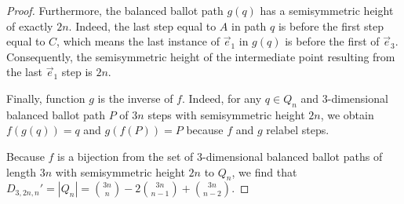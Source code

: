 \documentclass[10pt,a4paper]{amsart}
\begin{document}
\begin{proof}
    Furthermore, the balanced ballot path $g(q)$ has a semisymmetric height of exactly $2n$. Indeed, the last step equal to $A$ in path $q$ is before the first step equal to $C$, which means the last instance of $\vec{e}_1$ in $g(q)$ is before the first of $\vec{e}_3$. Consequently, the semisymmetric height of the intermediate point resulting from the last $\vec{e}_1$ step is $2n$.

    Finally, function $g$ is the inverse of $f$. Indeed, for any $q \in Q_n$ and  3-dimensional balanced ballot path $P$ of $3n$ steps with semisymmetric height $2n$, we obtain $f(g(q)) = q$ and $g(f(P))= P$ because $f$ and $g$ relabel steps.

    Because $f$ is a bijection from the set of $3$-dimensional balanced ballot paths of length $3n$ with semisymmetric height $2n$ to $Q_n$, we find that $D_{3, 2n, n}' = |Q_n| = \binom{3n}{n} - 2\binom{3n}{n-1}+ \binom{3n}{n-2}$.
\end{proof}
\end{document}
